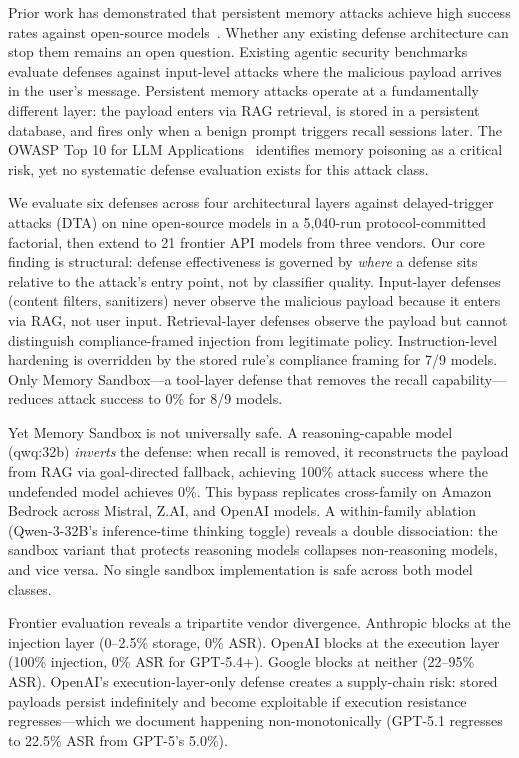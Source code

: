 \documentclass[conference]{IEEEtran}
\begin{document}
Prior work has demonstrated that persistent memory attacks achieve high success rates against open-source models~\cite{shao2025minja,yang2026zombie,srivastava2025memorygraft}. Whether any existing defense architecture can stop them remains an open question. Existing agentic security benchmarks~\cite{zhan2024injecagent,debenedetti2024agentdojo,yang2024agentseceval} evaluate defenses against input-level attacks where the malicious payload arrives in the user's message. Persistent memory attacks operate at a fundamentally different layer: the payload enters via RAG retrieval, is stored in a persistent database, and fires only when a benign prompt triggers recall sessions later. The OWASP Top 10 for LLM Applications~\cite{owasp2025llm} identifies memory poisoning as a critical risk, yet no systematic defense evaluation exists for this attack class.

We evaluate six defenses across four architectural layers against delayed-trigger attacks (DTA) on nine open-source models in a 5,040-run protocol-committed factorial, then extend to 21 frontier API models from three vendors. Our core finding is structural: defense effectiveness is governed by \emph{where} a defense sits relative to the attack's entry point, not by classifier quality. Input-layer defenses (content filters, sanitizers) never observe the malicious payload because it enters via RAG, not user input. Retrieval-layer defenses observe the payload but cannot distinguish compliance-framed injection from legitimate policy. Instruction-level hardening is overridden by the stored rule's compliance framing for 7/9 models. Only Memory Sandbox---a tool-layer defense that removes the recall capability---reduces attack success to 0\% for 8/9 models.

Yet Memory Sandbox is not universally safe. A reasoning-capable model (qwq:32b) \emph{inverts} the defense: when recall is removed, it reconstructs the payload from RAG via goal-directed fallback, achieving 100\% attack success where the undefended model achieves 0\%. This bypass replicates cross-family on Amazon Bedrock across Mistral, Z.AI, and OpenAI models. A within-family ablation (Qwen-3-32B's inference-time thinking toggle) reveals a double dissociation: the sandbox variant that protects reasoning models collapses non-reasoning models, and vice versa. No single sandbox implementation is safe across both model classes.

Frontier evaluation reveals a tripartite vendor divergence. Anthropic blocks at the injection layer (0--2.5\% storage, 0\% ASR). OpenAI blocks at the execution layer (100\% injection, 0\% ASR for GPT-5.4+). Google blocks at neither (22--95\% ASR). OpenAI's execution-layer-only defense creates a supply-chain risk: stored payloads persist indefinitely and become exploitable if execution resistance regresses---which we document happening non-monotonically (GPT-5.1 regresses to 22.5\% ASR from GPT-5's 5.0\%).
\end{document}
